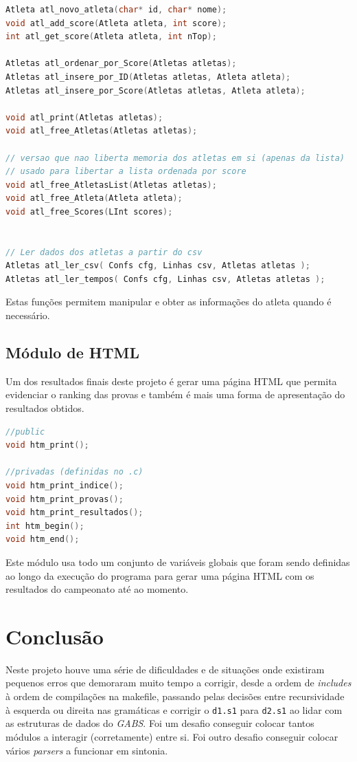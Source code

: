 \documentclass[11pt, a4paper, oneside]{article}
\begin{document}
\newpage
\begin{lstlisting}[language=C, caption={Assinatura das funções do módulo de atletas.}]
Atleta atl_novo_atleta(char* id, char* nome);
void atl_add_score(Atleta atleta, int score);
int atl_get_score(Atleta atleta, int nTop);

Atletas atl_ordenar_por_Score(Atletas atletas);
Atletas atl_insere_por_ID(Atletas atletas, Atleta atleta);
Atletas atl_insere_por_Score(Atletas atletas, Atleta atleta);

void atl_print(Atletas atletas);
void atl_free_Atletas(Atletas atletas);

// versao que nao liberta memoria dos atletas em si (apenas da lista)
// usado para libertar a lista ordenada por score
void atl_free_AtletasList(Atletas atletas);
void atl_free_Atleta(Atleta atleta);
void atl_free_Scores(LInt scores);


// Ler dados dos atletas a partir do csv
Atletas atl_ler_csv( Confs cfg, Linhas csv, Atletas atletas );
Atletas atl_ler_tempos( Confs cfg, Linhas csv, Atletas atletas );
\end{lstlisting}

Estas funções permitem manipular e obter as informações do atleta quando é necessário.

\newpage
\subsection{Módulo de HTML}
Um dos resultados finais deste projeto é gerar uma página HTML que permita evidenciar o ranking das provas e também é mais uma forma de apresentação do resultados obtidos.

\begin{lstlisting}[language=C, caption={Assinatura das funções.}]
//public
void htm_print();

//privadas (definidas no .c)
void htm_print_indice();
void htm_print_provas();
void htm_print_resultados();
int htm_begin();
void htm_end();
\end{lstlisting}

Este módulo usa todo um conjunto de variáveis globais que foram sendo definidas ao longo da execução do programa para gerar uma página HTML com os resultados do campeonato até ao momento.

\newpage
\section{Conclusão}

Neste projeto houve uma série de dificuldades e de situações onde existiram pequenos erros que demoraram muito tempo a corrigir, desde a ordem de \emph{includes} à ordem de compilações na makefile, passando pelas decisões entre recursividade à esquerda ou direita nas gramáticas e corrigir o \texttt{d1.s1} para \texttt{d2.s1} ao lidar com as estruturas de dados do \emph{GABS}. Foi um desafio conseguir colocar tantos módulos a interagir (corretamente) entre si. Foi outro desafio conseguir colocar vários \emph{parsers} a funcionar em sintonia.
\end{document}
